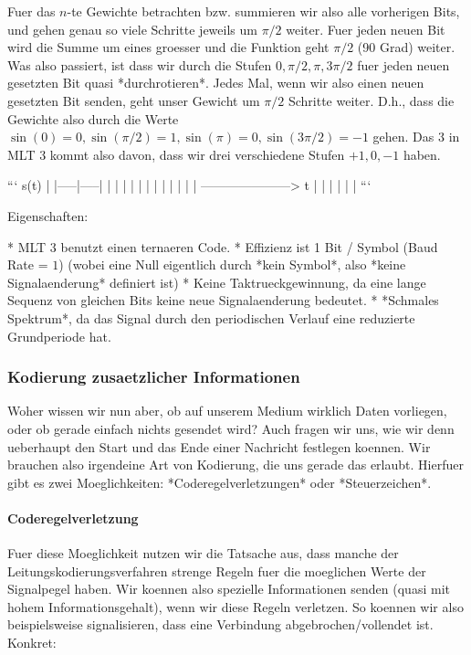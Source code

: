 Fuer das $n$-te Gewichte betrachten bzw. summieren wir also alle vorherigen Bits, und gehen genau so viele Schritte jeweils um $\pi/2$ weiter. Fuer jeden neuen Bit wird die Summe um eines groesser und die Funktion geht $\pi/2$ (90 Grad) weiter. Was also passiert, ist dass wir durch die Stufen $0, \pi/2, \pi, 3\pi/2$ fuer jeden neuen gesetzten Bit quasi *durchrotieren*. Jedes Mal, wenn wir also einen neuen gesetzten Bit senden, geht unser Gewicht um $\pi/2$ Schritte weiter. D.h., dass die Gewichte also durch die Werte $\sin(0) = 0, \sin(\pi/2) = 1, \sin(\pi) = 0, \sin(3\pi/2) = -1$ gehen. Das 3 in MLT 3 kommt also davon, dass wir drei verschiedene Stufen $+1, 0, -1$ haben.

```
         s(t)
          |
    |-----|-----|
    |     |     |
    |     |     |
    |     |     |
    |     |     |
---------------------> t
          |
          |
          |
          |
          |
          |
```

Eigenschaften:

* MLT 3 benutzt einen ternaeren Code.
* Effizienz ist 1 Bit / Symbol (Baud Rate = $1$) (wobei eine Null eigentlich durch *kein Symbol*, also *keine Signalaenderung* definiert ist)
* Keine Taktrueckgewinnung, da eine lange Sequenz von gleichen Bits keine neue Signalaenderung bedeutet.
* *Schmales Spektrum*, da das Signal durch den periodischen Verlauf eine
  reduzierte Grundperiode hat.

\subsubsection{ Kodierung zusaetzlicher Informationen}

Woher wissen wir nun aber, ob auf unserem Medium wirklich Daten vorliegen, oder
ob gerade einfach nichts gesendet wird? Auch fragen wir uns, wie wir denn
ueberhaupt den Start und das Ende einer Nachricht festlegen koennen. Wir
brauchen also irgendeine Art von Kodierung, die uns gerade das erlaubt. Hierfuer
gibt es zwei Moeglichkeiten: *Coderegelverletzungen* oder *Steuerzeichen*.

\paragraph{ Coderegelverletzung}

Fuer diese Moeglichkeit nutzen wir die Tatsache aus, dass manche der
Leitungskodierungsverfahren strenge Regeln fuer die moeglichen Werte der
Signalpegel haben. Wir koennen also spezielle Informationen senden (quasi mit
hohem Informationsgehalt), wenn wir diese Regeln verletzen. So koennen wir also
beispielsweise signalisieren, dass eine Verbindung abgebrochen/vollendet
ist. Konkret:

